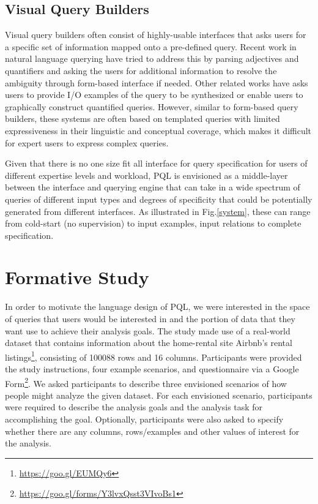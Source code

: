 \documentclass{sig-alternate-05-2015}
\begin{document}
\subsection{Visual Query Builders}
\par Visual query builders often consist of highly-usable interfaces that asks users for a specific set of information mapped onto a pre-defined query. Recent work in natural language querying have tried to address this by parsing adjectives and quantifiers and asking the users for additional information to resolve the ambiguity through form-based interface if needed\cite{Gao2015}. Other related works have asks users to provide I/O examples of the query to be synthesized\cite{Wang2017a,Wang2017,Jin2017} or enable users to graphically construct quantified queries\cite{Abouzied2012}. However, similar to form-based query builders, these systems are often based on templated queries with limited expressiveness in their linguistic and conceptual coverage, which makes it difficult for expert users to express complex queries. 
\par Given that there is no one size fit all interface for query specification for users of different expertise levels and workload, PQL is envisioned as a middle-layer between the interface and querying engine that can take in a wide spectrum of queries of different input types and degrees of specificity that could be potentially generated from different interfaces. As illustrated in Fig.\ref{system}, these can range from cold-start (no supervision) to input examples, input relations to complete specification.
\section{Formative Study}
\par In order to motivate the language design of PQL, we were interested in the space of queries that users would be interested in and the portion of data that they want use to achieve their analysis goals. The study made use of a real-world dataset that contains information about the home-rental site Airbnb's rental listings\footnote{\url{https://goo.gl/EUMQy6}}, consisting of 100088 rows and 16 columns. Participants were provided the study instructions, four example scenarios, and questionnaire via a Google Form\footnote{\url{https://goo.gl/forms/Y3lvxQsst3VIvoBs1}}. We asked participants to describe three envisioned scenarios of how people might analyze the given dataset. For each envisioned scenario, participants were required to describe the analysis goals and the analysis task for accomplishing the goal. Optionally, participants were also asked to specify whether there are any columns, rows/examples and other values of interest for the analysis. 
\end{document}
